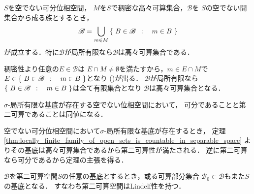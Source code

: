 	\begin{screen}
		\begin{thm}[可分空間の局所有限な開集合族は高々可算集合]
		\label{thm:locally_finite_family_of_open_sets_is_countable_in_separable_space}
			$S$を空でない可分位相空間，
			$M$を$S$で稠密な高々可算集合，$\mathscr{B}$を
			$S$の空でない開集合から成る族とするとき，
			\begin{align}
				\mathscr{B} = \bigcup_{m \in M} \left\{\ B \in \mathscr{B}\ \, : \quad m \in B\ \right\}
				\label{eq:thm_locally_finite_family_of_open_sets_is_countable_in_separable_space}
			\end{align}
			が成立する．特に$\mathscr{B}$が局所有限なら$\mathscr{B}$は高々可算集合である．
		\end{thm}
	\end{screen}
	
	\begin{prf}
		稠密性より任意の$E \in \mathscr{B}$は
		$E \cap M \neq \emptyset$を満たすから，$m \in E \cap M$で$
		E \in \left\{\ B \in \mathscr{B}\ \, : \quad m \in B\ \right\}$となり
		()が出る．
		$\mathscr{B}$が局所有限なら$\left\{\ B \in \mathscr{B}\ \, : \quad m \in B\ \right\}$は全て有限集合となり
		$\mathscr{B}$は高々可算集合となる．
		\QED	
	\end{prf}
	
	\begin{screen}
		\begin{thm}
			$\sigma$-局所有限な基底が存在する空でない位相空間において，
			可分であることと第二可算であることは同値になる．
		\end{thm}
	\end{screen}
	
	\begin{prf}
		空でない可分位相空間において$\sigma$-局所有限な基底が存在するとき，
		定理\ref{thm:locally_finite_family_of_open_sets_is_countable_in_separable_space}
		よりその基底は高々可算集合であるから第二可算性が満たされる．
		逆に第二可算なら可分であるから定理の主張を得る．
		\QED
	\end{prf}
	
	\begin{screen}
		\begin{thm}[第二可算空間の任意の基底は可算基を内包する]\label{thm:countable_base_of_second_countable_space}
			$\mathscr{B}$を第二可算空間$S$の任意の基底とするとき，或る可算部分集合
			$\mathscr{B}_0 \subset \mathscr{B}$もまた$S$の基底となる．
			すなわち第二可算空間はLindel\Ddot{o}f性を持つ．
		\end{thm}
	\end{screen}
	
